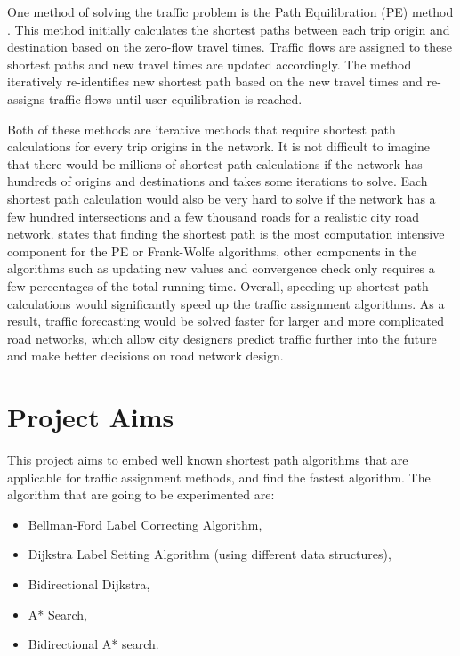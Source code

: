 One method of solving the traffic problem is the Path Equilibration (PE) method \citep{Florian}.
This method initially calculates the shortest paths between each trip origin and destination based on the zero-flow travel times.
Traffic flows are assigned to these shortest paths and new travel times are updated accordingly.
The method iteratively re-identifies new shortest path based on the new travel times and re-assigns traffic flows until user equilibration is reached.


Both of these methods are iterative methods that require shortest path calculations for every trip origins in the network.
It is not difficult to imagine that there would be millions of shortest path calculations if the network has hundreds of origins and destinations and takes some iterations to solve.
Each shortest path calculation would also be very hard to solve if the network has a few hundred intersections and a few thousand roads for a realistic city road network.
\citet{Sheffi} states that finding the shortest path is the most computation intensive component for the PE or Frank-Wolfe algorithms, 
other components in the algorithms such as updating new values and convergence check only requires a few percentages of the total running time.
Overall, speeding up shortest path calculations would significantly speed up the traffic assignment algorithms.
As a result,
traffic forecasting would be solved faster for larger and more complicated road networks,
which allow city designers predict traffic further into the future and make better decisions on road network design.

\section{Project Aims}
This project aims to embed well known shortest path algorithms that are applicable for traffic assignment methods, and find the fastest algorithm.
The algorithm that are going to be experimented are:
\begin{itemize}
    \item Bellman-Ford Label Correcting Algorithm,
    \item Dijkstra Label Setting Algorithm (using different data structures),
    \item Bidirectional Dijkstra,
    \item A* Search,
    \item Bidirectional A* search.
\end{itemize}

